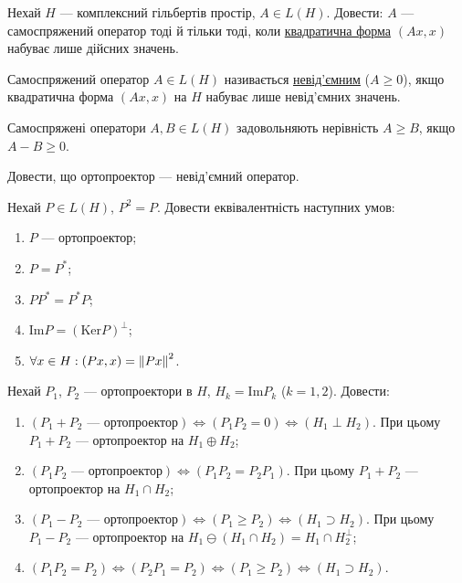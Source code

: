 \begin{exercise}
    Нехай $H$ --- комплексний гільбертів простір, $A \in L(H)$. Довести: 
    $A$ --- самоспряжений оператор тоді й тільки тоді, коли 
    \uline{квадратична форма} $(Ax, x)$ набуває лише дійсних значень.
\end{exercise}

\begin{theory}
    Самоспряжений оператор $A \in L(H)$ називається \uline{невід'ємним} ($A \geq 0$),
    якщо квадратична форма $(Ax, x)$ на $H$ набуває лише невід'ємних значень.

    Самоспряжені оператори $A, B \in L(H)$ задовольняють нерівність $A \geq B$, якщо $A - B \geq 0$.
\end{theory}

\begin{exercise}
    Довести, що ортопроектор --- невід'ємний оператор.
\end{exercise}

\begin{exercise}
    Нехай $P \in L(H)$, $P^2 = P$. Довести еквівалентність наступних умов:
    \begin{enumerate}[label=\ukr*)]
        \item $P$ --- ортопроектор;
        \item $P = P^*$;
        \item $P P^* = P^* P$;
        \item $\mathrm{Im} P = (\mathrm{Ker} P)^\perp$;
        \item $\forall x \in H: (Px, x) = \left\lVert Px\right\rVert^2$.
    \end{enumerate}
\end{exercise}

\begin{exercise}
    Нехай $P_1$, $P_2$ --- ортопроектори в $H$, $H_k = \mathrm{Im} P_k$ ($k = 1, 2$).
    Довести:
    \begin{enumerate}[label=\ukr*)]
        \item $(P_1 + P_2 \text{ --- ортопроектор}) \Leftrightarrow (P_1 P_2 = 0) \Leftrightarrow (H_1 \perp H_2)$.
        При цьому $P_1 + P_2$ --- ортопроектор на $H_1 \oplus H_2$;
        \item $(P_1 P_2 \text{ --- ортопроектор}) \Leftrightarrow (P_1 P_2 = P_2 P_1)$.
        При цьому $P_1 + P_2$ --- ортопроектор на $H_1 \cap H_2$;
        \item $(P_1 - P_2 \text{ --- ортопроектор}) \Leftrightarrow (P_1 \geq P_2) \Leftrightarrow (H_1 \supset H_2)$.
        При цьому $P_1 - P_2$ --- ортопроектор на $H_1 \ominus (H_1 \cap H_2) = H_1 \cap H_2^\perp$;
        \item $(P_1 P_2 = P_2) \Leftrightarrow (P_2 P_1 = P_2) \Leftrightarrow (P_1 \geq P_2) \Leftrightarrow (H_1 \supset H_2)$.
    \end{enumerate}
\end{exercise}

